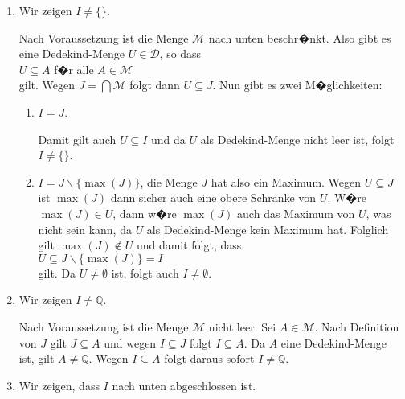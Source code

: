 \begin{enumerate}
\item Wir zeigen $I \not= \{\}$.

      Nach Voraussetzung ist die Menge $\mathcal{M}$ nach unten beschr�nkt.  Also gibt es eine Dedekind-Menge 
      $U \in \mathcal{D}$, so dass
      \\[0.2cm]
      \hspace*{1.3cm}
      $U \subseteq A$ \quad f�r alle $A \in \mathcal{M}$
      \\[0.2cm]
      gilt.  Wegen $J = \bigcap \mathcal{M}$ folgt dann $U \subseteq J$.  Nun gibt es zwei
      M�glichkeiten:
      \begin{enumerate}
      \item $I = J$.

            Damit gilt auch $U \subseteq I$  und da $U$ als Dedekind-Menge nicht leer
            ist, folgt $I \not= \{\}$.
      \item $I = J \backslash \{ \max(J) \}$, die Menge $J$ hat also ein Maximum.
            Wegen $U \subseteq J$ ist $\max(J)$ dann sicher auch eine obere Schranke
            von $U$.  W�re $\max(J) \in U$, dann w�re $\max(J)$ auch das Maximum von $U$,
            was nicht sein kann, da $U$ als Dedekind-Menge kein Maximum hat.
            Folglich gilt $\max(J) \not\in U$ und damit folgt, dass
            \\[0.2cm]
            \hspace*{1.3cm}
            $U \subseteq J \backslash \{ \max(J) \} = I$
            \\[0.2cm]
            gilt.  Da $U \not= \emptyset$ ist, folgt auch $I \not= \emptyset$.
      \end{enumerate}
\item Wir zeigen $I \not= \mathbb{Q}$.

      Nach Voraussetzung ist die Menge $\mathcal{M}$ nicht leer.  Sei $A \in \mathcal{M}$. Nach
      Definition von $J$ gilt $J \subseteq A$ und wegen $I \subseteq J$ folgt  $I \subseteq A$.
      Da $A$ eine Dedekind-Menge ist, gilt $A \not= \mathbb{Q}$.  Wegen $I \subseteq A$ folgt daraus sofort
      $I \not= \mathbb{Q}$.
\item Wir zeigen, dass $I$ nach unten abgeschlossen ist.


\end{enumerate}

